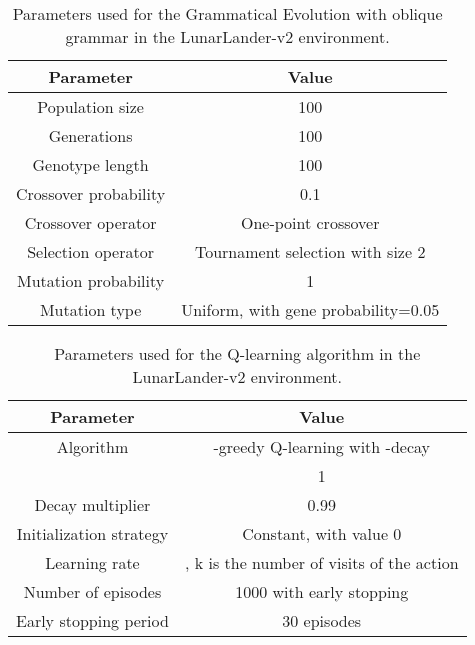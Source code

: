 \documentclass[review,english]{elsarticle}
\begin{document}
\begin{table}
    \centering
    \begin{tabular}{|c|c|} \hline
        \textbf{Parameter} & \textbf{Value} \\ \hline
        Population size & 100 \\ Generations & 100 \\ Genotype length & 100 \\ Crossover probability & 0.1 \\ Crossover operator & One-point crossover \\ Selection operator & Tournament selection with size 2 \\ Mutation probability & 1 \\ Mutation type & Uniform, with gene probability=0.05 \\ \hline
    \end{tabular}
    \caption{Parameters used for the Grammatical Evolution with oblique grammar in the LunarLander-v2 environment.}
    \label{tab:ll_obl_params_ge}
\end{table}

\begin{table}
    \centering
    \begin{tabular}{|c|c|} \hline
        \textbf{Parameter} & \textbf{Value} \\ \hline
        Algorithm & -greedy Q-learning with -decay \\  & 1 \\ Decay multiplier & 0.99 \\ Initialization strategy& Constant, with value 0 \\ Learning rate & , k is the number of visits of the action \\ Number of episodes & 1000 with early stopping \\ Early stopping period & 30 episodes \\ \hline
    \end{tabular}
    \caption{Parameters used for the Q-learning algorithm in the LunarLander-v2 environment.}
    \label{tab:ll_params_q}
\end{table}
\end{document}
